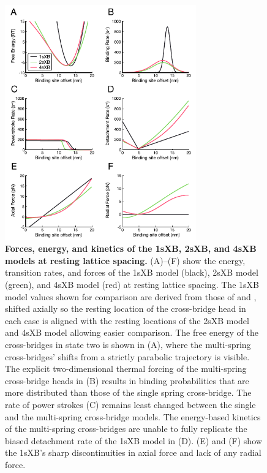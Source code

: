 \documentclass[10pt]{article}
\newcommand{\citet}[1]{\cite{#1}}
\begin{document}
\clearpage
\begin{figure}[ht]
    \begin{center}
    \includegraphics[width=3.25in]{../imgs/Figure3.pdf}
    \caption{ \textbf{Forces, energy, and kinetics of the 1sXB, 2sXB, and 4sXB models at resting lattice spacing.}
        (A)--(F) show the energy, transition rates, and forces of the 1sXB model (black), 2sXB model (green), and 4sXB model (red) at resting lattice spacing.  
        The 1sXB model values shown for comparison are derived from those of \protect\citet{Daniel1998} and \protect\citet{Tanner2007}, shifted axially so the resting location of the cross-bridge head in each case is aligned with the resting locations of the 2sXB model and 4sXB model allowing easier comparison. 
        The free energy of the cross-bridges in state two is shown in (A), where the multi-spring cross-bridges' shifts from a strictly parabolic trajectory is visible. 
        The explicit two-dimensional thermal forcing of the multi-spring cross-bridge heads in (B) results in binding probabilities that are more distributed than those of the single spring cross-bridge.
        The rate of power strokes (C) remains least changed between the single and the multi-spring cross-bridge models.  
        The energy-based kinetics of the multi-spring cross-bridges are unable to fully replicate the biased detachment rate of the 1sXB model in (D).
        (E) and (F) show the 1sXB's sharp discontinuities in axial force and lack of any radial force.
        \label{fig_kinetics_cuts}
        }
    \end{center}
\end{figure}
\end{document}
